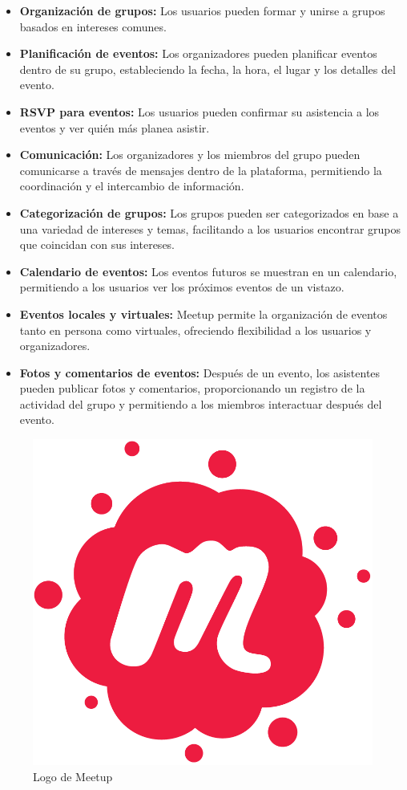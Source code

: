 \begin{itemize}
  \item \textbf{Organización de grupos:} Los usuarios pueden formar y unirse a grupos basados en intereses comunes.
  \item \textbf{Planificación de eventos:} Los organizadores pueden planificar eventos dentro de su grupo, estableciendo la fecha, la hora, el lugar y los detalles del evento.
  \item \textbf{RSVP para eventos:} Los usuarios pueden confirmar su asistencia a los eventos y ver quién más planea asistir.
  \item \textbf{Comunicación:} Los organizadores y los miembros del grupo pueden comunicarse a través de mensajes dentro de la plataforma, permitiendo la coordinación y el intercambio de información.
  \item \textbf{Categorización de grupos:} Los grupos pueden ser categorizados en base a una variedad de intereses y temas, facilitando a los usuarios encontrar grupos que coincidan con sus intereses.
  \item \textbf{Calendario de eventos:} Los eventos futuros se muestran en un calendario, permitiendo a los usuarios ver los próximos eventos de un vistazo.
  \item \textbf{Eventos locales y virtuales:} Meetup permite la organización de eventos tanto en persona como virtuales, ofreciendo flexibilidad a los usuarios y organizadores.
  \item \textbf{Fotos y comentarios de eventos:} Después de un evento, los asistentes pueden publicar fotos y comentarios, proporcionando un registro de la actividad del grupo y permitiendo a los miembros interactuar después del evento.
\end{itemize}
\begin{figure}[H]
        \centering
        \includegraphics[width=.5\linewidth]{images/Meetup_Logo.png}
        \caption{Logo de Meetup}
        \label{fig:meetup_logo}
    \end{figure}

